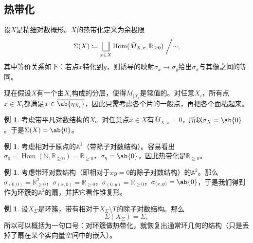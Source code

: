 \documentclass{amsart}
\theoremstyle{definition}
\newtheorem{exm}[thm]{例}
\theoremstyle{remark}
\theoremstyle{plain}
\theoremstyle{definition}
\theoremstyle{remark}
\newcommand{\A}{\mathbb{A}}
\newcommand{\N}{\mathbb{N}}
\newcommand{\R}{\mathbb{R}}
\newcommand{\ol}[1]{\overline{#1}}
\newcommand{\1}{\mathbf{1}}
\newcommand{\2}{\mathbf{2}}
\newcommand{\3}{\mathbf{3}}
\DeclareMathOperator{\Hom}{Hom}
\begin{document}
\subsection{热带化}%
\label{sub:Tropicalization}

设\(X\)是精细对数概形。\(X\)的热带化定义为余极限
\[\Sigma(X) \coloneqq \bigsqcup_{x \in X} \Hom(\bar{M}_{X,x}, \R_{\geq 0}) \biggm/ \sim, \]
其中等价关系如下：若点\(x\)特化到\(y\)，则诱导的映射\(\sigma_x \to \sigma_y\)给出\(\sigma_x\)与其像之间的等同。

现在假设\(X\)有一个由\(X_i\)构成的分层，使得\(\bar{M}_{|X_i}\)是常值的。对任意\(X_i\)，所有点\(x \in X_i\)都满足\(x \in \ol{\ab\{\eta_{X_i}\}}\)，因此只需考虑各个片的一般点，再把各个面粘起来。

\begin{exm}
    考虑带平凡对数结构的\(X\)。对任意点\(x \in X\)有\(\bar{M}_{X,x} = 0\)，所以\(\sigma_X = \ab\{0\}\)。于是\(\Sigma(X) = \ab\{0\}\)。
\end{exm}

\begin{exm}
    考虑相对于原点的\(\A^1\)（带除子对数结构）。容易看出\(\sigma_0 = \Hom(\N, \R_{\geq 0}) = \R_{\geq 0}\)，\(\sigma_{\eta} = \ab\{0\}\)，因此热带化是\(\R_{\geq 0}\)。
\end{exm}

\begin{exm}
    考虑带环对数结构（即相对于\(xy = 0\)的除子对数结构）的\(\A^2\)。那么\(\sigma_{(0,0)} = \R^2_{\geq 0}\)，\(\sigma_{(x,0)} = \R_{\geq 0}\)，\(\sigma_{(0,y)} = \R_{\geq 0}\)，\(\sigma_{(x,y)} = \ab\{0\}\)，于是我们得到作为环簇的\(\A^2\)的扇，并把它看作锥复形。
\end{exm}

\begin{exm}
    设\(X_{\Sigma}\)是环簇，带有相对于\(X_{\Sigma} \setminus T\)的除子对数结构。那么
    \[ \Sigma(X_{\Sigma}) = \Sigma, \]
    所以可以概括为一句口号：对环簇做热带化，就恢复出通常环几何的结构（只是丢掉了扇在某个实向量空间中的嵌入）。
\end{exm}
\end{document}
